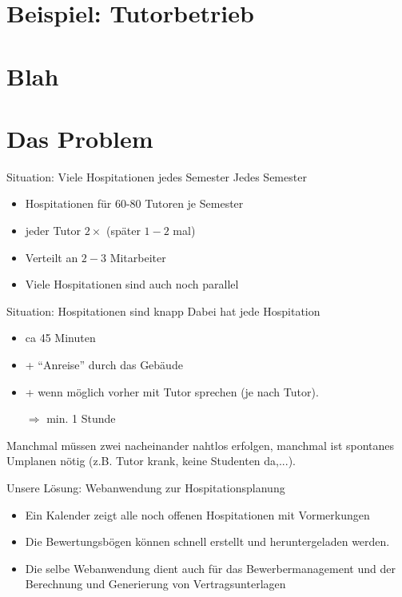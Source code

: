\documentclass{beamer}
\begin{document}
\section{Beispiel: Tutorbetrieb}

\section{Blah}
\section{Das Problem}
\begin{frame}{Situation: Viele Hospitationen jedes Semester}
Jedes Semester
\begin{itemize}
	\item Hospitationen für 60-80 Tutoren je Semester
	\item jeder Tutor $2\times$ (später $1-2$ mal)
	\item Verteilt an $2-3$ Mitarbeiter
	\item Viele Hospitationen sind auch noch parallel
\end{itemize}
\end{frame}

\begin{frame}{Situation: Hospitationen sind knapp}
Dabei hat jede Hospitation
\begin{itemize}
\item ca 45 Minuten
\item + \enquote{Anreise} durch das Gebäude
\item + wenn möglich vorher mit Tutor sprechen (je nach Tutor).
\item[$\Rightarrow$] min. 1 Stunde
\end{itemize}
Manchmal müssen zwei nacheinander nahtlos erfolgen, manchmal ist spontanes Umplanen nötig (z.B. Tutor krank, keine Studenten da,...).
\end{frame}

\begin{frame}{Unsere Lösung: Webanwendung zur Hospitationsplanung}
\begin{itemize}
	\item Ein Kalender zeigt alle noch offenen Hospitationen mit Vormerkungen
	\item Die Bewertungsbögen können schnell erstellt und heruntergeladen werden.
	\item Die selbe Webanwendung dient auch für das Bewerbermanagement und der Berechnung und Generierung von Vertragsunterlagen
\end{itemize}
\end{frame}
\end{document}
